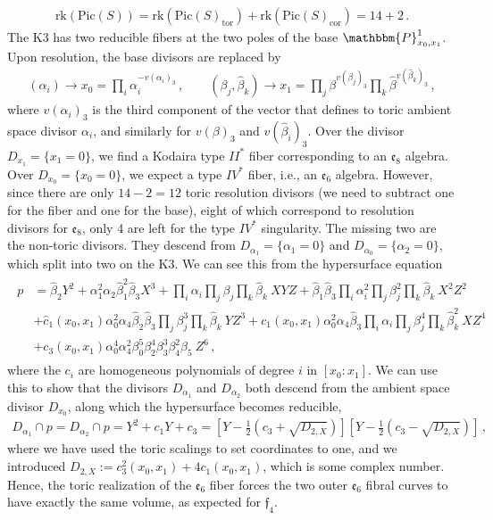 \documentclass[11pt]{article}
\numberwithin{equation}{section}
\newcommand{\ff}{\mathfrak{f}}
\newcommand{\fe}{\mathfrak{e}}
\newcommand{\rk}{\text{rk}}
\newcommand{\Pic}{\text{Pic}}
\begin{document}
\begin{align}
    \rk(\Pic(S))=\rk(\Pic(S)_\text{tor})+\rk(\Pic(S)_\text{cor})=14+2 \, . 
\end{align} 
The K3 has two reducible fibers at the two poles of the base $\mathbbm{P}^1_{x_0,x_1}$. Upon resolution, the base divisors are replaced by
\begin{align}
    (\alpha_i) \rightarrow x_0 = \prod_i \alpha_i^{-v(\alpha_i)_3}\,, \qquad  (\beta_j,\hat{\beta}_k) \rightarrow x_1 = \prod_j \beta^{v(\beta_j)_3} \prod_k \hat{\beta}^{v(\hat{\beta}_k)_3} \,, 
\end{align}
where $v(\alpha_i)_3$ is the third component of the vector that defines to toric ambient space divisor $\alpha_i$, and similarly for $v(\beta)_3$ and $v(\hat{\beta}_i)_3$. Over the divisor $D_{x_1}=\{x_1=0\}$, we find a Kodaira type $II^*$ fiber corresponding to an $\fe_8$ algebra. Over $D_{x_0}=\{x_0=0\}$, we expect a type $IV^*$ fiber, i.e., an $\fe_6$ algebra. However, since there are only $14-2=12$ toric resolution  divisors (we need to subtract one for the fiber and one for the base), eight of which correspond to resolution divisors for $\fe_8$, only 4 are left for the type $IV^*$ singularity. The missing two are the non-toric divisors. They descend from $D_{\alpha_1}=\{\alpha_1=0\}$ and $D_{\alpha_0}=\{\alpha_2=0\}$, which split into two on the K3. We can see this from the hypersurface equation
\begin{align}
\begin{split}
p&= \hat{\beta}_2 Y^2  + \alpha_1^2 \alpha_2 \hat{\beta}_1^2 \hat{\beta}_3 X^3 + \prod_i \alpha_i \prod_j \beta_j \prod_k \hat{\beta}_k~ X Y Z + \hat{\beta}_1\hat{\beta}_3\prod_i \alpha_i^2 \prod_j \beta_j^2 \prod_k \hat{\beta}_k~X^2 Z^2\\ 
& + \hat{c}_1(x_0,x_1)\alpha_0^2 \alpha_4\hat{\beta}_2\hat{\beta}_3 \prod_j \beta_j^3 \prod_k \hat{\beta}_k~Y Z^3 + c_1(x_0,x_1)\alpha_0^2\alpha_ 4\hat{\beta}_3 \prod_i \alpha_i \prod_j \beta_j^4 \prod_k \hat{\beta}_k^2~X Z^4   \\ 
& + c_3(x_0,x_1)\alpha_0^4 \alpha_4^2 \beta_0^5 \beta_2^4 \beta_3^3 \beta_4^2 \beta_5~Z^6 \,,
\end{split}
\end{align}
where the $c_i$ are homogeneous polynomials of degree $i$ in $[x_0:x_1]$. We can use this to show that the divisors $D_{\alpha_1}$ and $D_{\alpha_2}$ both descend from the ambient space divisor $D_{x_0}$, along which the hypersurface becomes reducible,
\begin{align}
\label{eq:SplitDivisors}
    {D_{\alpha_{1}}}\cap p={D_{\alpha_{2}}}\cap p=Y^2 +   c_1 Y  + c_3  = \left[Y- \frac12 \left(  c_3 + \sqrt{D_{2,X}} \right)\right]\left[Y- \frac12 \left(  c_3 - \sqrt{D_{2,X}} \right)\right]\,,
\end{align}
where we have used the toric scalings to set coordinates to one, and we introduced $D_{2,X}:=c_3^2(x_0,x_1)+ 4 c_1(x_0,x_1)$, which is some complex number. Hence, the toric realization of the $\fe_6$ fiber forces the two outer $\fe_6$ fibral curves to have exactly the same volume, as expected for $\ff_4$. 
\end{document}
